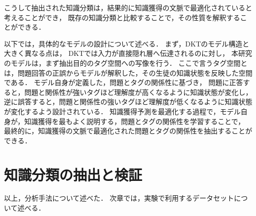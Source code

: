 こうして抽出された知識分類は，結果的に知識獲得の文脈で最適化されていると考えることができ，
既存の知識分類と比較することで，その性質を解釈することができる．


以下では，具体的なモデルの設計について述べる．
まず，DKTのモデル構造と大きく異なる点は，
DKTでは入力が直接隠れ層へ伝達されるのに対し，
本研究のモデルは，まず抽出目的のタグ空間への写像を行う．
ここで言うタグ空間とは，問題回答の正誤からモデルが解釈した，その生徒の知識状態を反映した空間である．
モデル自身が定義した，問題とタグの関係性に基づき，
問題に正答すると，問題と関係性が強いタグほど理解度が高くなるように知識状態が変化し，
逆に誤答すると，問題と関係性の強いタグほど理解度が低くなるように知識状態が変化するよう設計されている．
知識獲得予測を最適化する過程で，モデル自身が，知識獲得を最もよく説明する，問題とタグの関係性を学習することで，
最終的に，知識獲得の文脈で最適化された問題とタグの関係性を抽出することができる．





\section{知識分類の抽出と検証}






\vvspace
以上，分析手法について述べた．
次章では，実験で利用するデータセットについて述べる．


